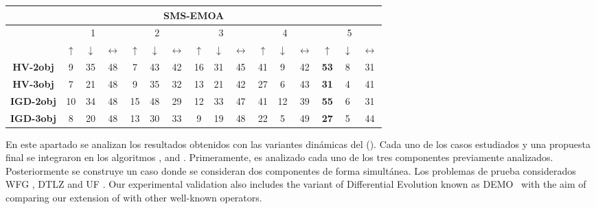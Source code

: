 \begin{table}[t]
\begin{tabular}{|c|c|c|c|c|c|c|c|c|c|c|c|c|c|c|c|}
\hline
\hline
\multicolumn{16}{|c|}{SMS-EMOA} \\ \hline
 & \multicolumn{3}{c|}{1} & \multicolumn{3}{c|}{2} & \multicolumn{3}{c|}{3} & \multicolumn{3}{c|}{4} & \multicolumn{3}{c|}{5} \\ \hline
 & $\uparrow$ & $\downarrow$ & $\longleftrightarrow$ & $\uparrow$ & $\downarrow$ & $\longleftrightarrow$ & $\uparrow$ & $\downarrow$ & $\longleftrightarrow$ & $\uparrow$ & $\downarrow$ & $\longleftrightarrow$ & $\uparrow$ & $\downarrow$ & $\longleftrightarrow$ \\ \hline
\textbf{HV-2obj} & 9 & 35 & 48 & 7 & 43 & 42 & 16 & 31 & 45 & 41 & 9 & 42 & \textbf{53} & 8 & 31 \\ \hline
\textbf{HV-3obj} & 7 & 21 & 48 & 9 & 35 & 32 & 13 & 21 & 42 & 27 & 6 & 43 & \textbf{31} & 4 & 41 \\ \hline
\textbf{IGD-2obj} & 10 & 34 & 48 & 15 & 48 & 29 & 12 & 33 & 47 & 41 & 12 & 39 & \textbf{55} & 6 & 31 \\ \hline
\textbf{IGD-3obj} & 8 & 20 & 48 & 13 & 30 & 33 & 9 & 19 & 48 & 22 & 5 & 49 & \textbf{27} & 5 & 44 \\ \hline
\end{tabular}
\end{table}

En este apartado se analizan los resultados obtenidos con las variantes dinámicas del \SBX{} (\DSBX{}).
%
Cada uno de los casos estudiados y una propuesta final se integraron en los algoritmos \NSGAII{}, \MOEAD{} and \SMSEMOA{}.
%
Primeramente, es analizado cada uno de los tres componentes previamente analizados.
%
Posteriormente se construye un caso donde se consideran dos componentes de forma simultánea.
%
Los problemas de prueba considerados  WFG \cite{Joel:WFG}, DTLZ \cite{Joel:DTLZ_2} and UF \cite{zhang2009performance}.
%
Our experimental validation also includes the variant of Differential Evolution known as DEMO~\cite{tuvsar2007differential}
with the aim of comparing our extension of \SBX{} with other well-known operators.

